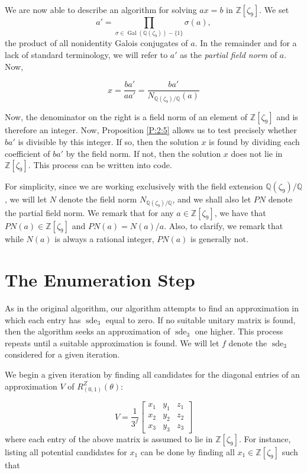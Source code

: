 \documentclass[12pt]{amsart}
\theoremstyle{definition}
\newcommand{\Q}{\mathbb{Q}}
\DeclareMathOperator{\Gal}{Gal} %
\newcommand{\Zn}{\mathbb{Z}[\zeta_9]}
\DeclareMathOperator{\sde}{sde}
\begin{document}
	We are now able to describe an algorithm for solving $ax = b$ in $\Zn$. We set $$a' = \prod_{\sigma \in \Gal(\Q(\zeta_9)) - \{1\}}\sigma(a),$$ the product of all nonidentity Galois conjugates of $a$. In the remainder and for a lack of standard terminology, we will refer to $a'$ as the \emph{partial field norm} of $a$. Now,
	
	$$
	x = \dfrac{ba'}{aa'} = \dfrac{ba'}{N_{\Q(\zeta_9)/\Q}(a) }
	$$
	
	Now, the denominator on the right is a field norm of an element of $\Zn$ and is therefore an integer. Now, Proposition \ref{P:2:5} allows us to test precisely whether $ba'$ is divisible by this integer. If so, then the solution $x$ is found by dividing each coefficient of $ba'$ by the field norm. If not, then the solution $x$ does not lie in $\Zn$. This process can be written into code. 
	
	For simplicity, since we are working exclusively with the field extension $\Q(\zeta_9)/\Q$, we will let $N$ denote the field norm $N_{\Q(\zeta_9)/\Q}$, and we shall also let $PN$ denote the partial field norm. We remark that for any $a \in \Zn$, we have that $PN(a) \in \Zn$ and $PN(a) = N(a)/a$. Also, to clarify, we remark that while $N(a)$ is always a rational integer, $PN(a)$ is generally not. 
	
	\section{The Enumeration Step}
	
	As in the original algorithm, our algorithm attempts to find an approximation in which each entry has $\sde_3$ equal to zero. If no suitable unitary matrix is found, then the algorithm seeks an approximation of $\sde_3$ one higher. This process repeats until a suitable approximation is found. We will let $f$ denote the $\sde_3$ considered for a given iteration.
	
	We begin a given iteration by finding all candidates for the diagonal entries of an approximation $V$ of $R_{(0,1)}^Z(\theta)$:
	
	
	$$V = \dfrac{1}{3^f}
		\begin{bmatrix}
		x_1 & y_1 & z_1 \\
		x_2 & y_2 & z_2 \\
		x_3 & y_3 & z_3
	\end{bmatrix}	$$
	where each entry of the above matrix is assumed to lie in $\Zn$. For instance, listing all potential candidates for $x_1$ can be done by finding all $x_1 \in \Zn$ such that
	
\end{document}
